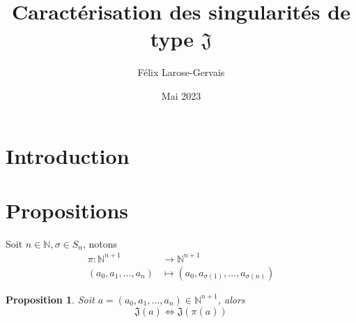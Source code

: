\documentclass{article}
\title{Caractérisation des singularités de type $\mathfrak{J}$}
\author{Félix Larose-Gervais}
\date{Mai 2023}
\newtheorem{proposition}{Proposition}
\begin{document}
\maketitle

\section{Introduction}

\newpage

\section{Propositions}

Soit $n \in \mathbb{N}, \sigma \in S_n$, notons
\begin{align*}
    \pi : \mathbb{N}^{n+1} & \to \mathbb{N}^{n+1}                               \\
    (a_0, a_1, \dots, a_n) & \mapsto (a_0, a_{\sigma(1)}, \dots, a_{\sigma(n)})
\end{align*}

\begin{proposition}
    Soit $a=(a_0, a_1, \dots, a_n) \in \mathbb{N}^{n+1}$, alors
    $$\mathfrak{J}(a) \iff \mathfrak{J}(\pi(a))$$
\end{proposition}
\end{document}
